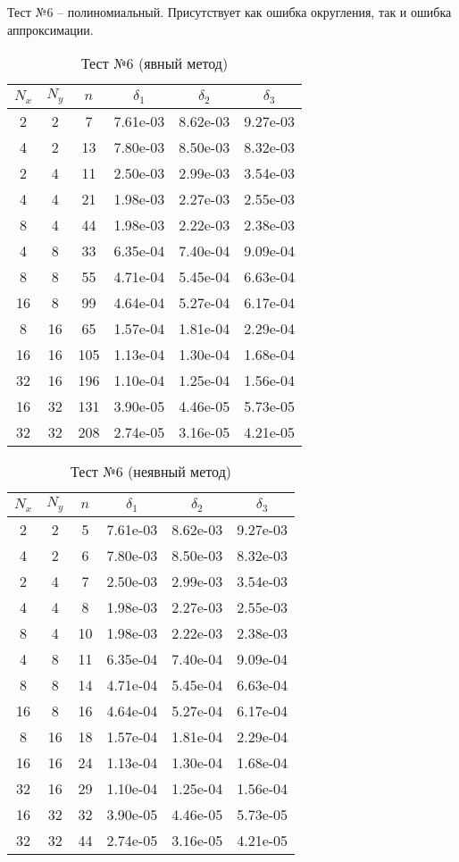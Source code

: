 \newpage
Тест №6 -- полиномиальный. Присутствует как ошибка округления, так и ошибка аппроксимации.
\begin{table}[H]
	\centering
	\begin{tabular}{*6c}
		\toprule
		$N_x$ & $N_y$ & $n$ & $\delta_1$ & $\delta_2$ & $\delta_3$ \\
		\midrule
		2 & 2 & 7 & 7.61e-03 & 8.62e-03 & 9.27e-03 \\
		4 & 2 & 13 & 7.80e-03 & 8.50e-03 & 8.32e-03 \\
		2 & 4 & 11 & 2.50e-03 & 2.99e-03 & 3.54e-03 \\
		4 & 4 & 21 & 1.98e-03 & 2.27e-03 & 2.55e-03 \\
		8 & 4 & 44 & 1.98e-03 & 2.22e-03 & 2.38e-03 \\
		4 & 8 & 33 & 6.35e-04 & 7.40e-04 & 9.09e-04 \\
		8 & 8 & 55 & 4.71e-04 & 5.45e-04 & 6.63e-04 \\
		16 & 8 & 99 & 4.64e-04 & 5.27e-04 & 6.17e-04 \\
		8 & 16 & 65 & 1.57e-04 & 1.81e-04 & 2.29e-04 \\
		16 & 16 & 105 & 1.13e-04 & 1.30e-04 & 1.68e-04 \\
		32 & 16 & 196 & 1.10e-04 & 1.25e-04 & 1.56e-04 \\
		16 & 32 & 131 & 3.90e-05 & 4.46e-05 & 5.73e-05 \\
		32 & 32 & 208 & 2.74e-05 & 3.16e-05 & 4.21e-05 \\
		\bottomrule
	\end{tabular}
	\caption{Тест №6 (явный метод)}
\end{table}
\begin{table}[H]
	\centering
	\begin{tabular}{*6c}
		\toprule
		$N_x$ & $N_y$ & $n$ & $\delta_1$ & $\delta_2$ & $\delta_3$ \\
		\midrule
		2 & 2 & 5 & 7.61e-03 & 8.62e-03 & 9.27e-03 \\
		4 & 2 & 6 & 7.80e-03 & 8.50e-03 & 8.32e-03 \\
		2 & 4 & 7 & 2.50e-03 & 2.99e-03 & 3.54e-03 \\
		4 & 4 & 8 & 1.98e-03 & 2.27e-03 & 2.55e-03 \\
		8 & 4 & 10 & 1.98e-03 & 2.22e-03 & 2.38e-03 \\
		4 & 8 & 11 & 6.35e-04 & 7.40e-04 & 9.09e-04 \\
		8 & 8 & 14 & 4.71e-04 & 5.45e-04 & 6.63e-04 \\
		16 & 8 & 16 & 4.64e-04 & 5.27e-04 & 6.17e-04 \\
		8 & 16 & 18 & 1.57e-04 & 1.81e-04 & 2.29e-04 \\
		16 & 16 & 24 & 1.13e-04 & 1.30e-04 & 1.68e-04 \\
		32 & 16 & 29 & 1.10e-04 & 1.25e-04 & 1.56e-04 \\
		16 & 32 & 32 & 3.90e-05 & 4.46e-05 & 5.73e-05 \\
		32 & 32 & 44 & 2.74e-05 & 3.16e-05 & 4.21e-05 \\
		\bottomrule
	\end{tabular}
	\caption{Тест №6 (неявный метод)}
\end{table}

